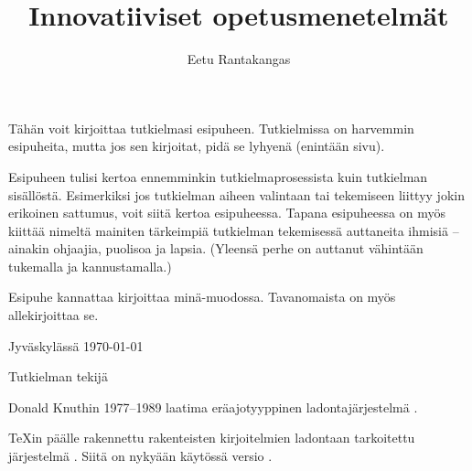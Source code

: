 \documentclass[utf8,bachelor]{gradu3}
\begin{document}
\title{Innovatiiviset opetusmenetelmät}

\author{Eetu Rantakangas}
\supervisor{-}

\maketitle

\preface
Tähän voit kirjoittaa tutkielmasi esipuheen.  Tutkielmissa on
harvemmin esipuheita, mutta jos sen kirjoitat, pidä se lyhyenä
(enintään sivu).

Esipuheen tulisi kertoa ennemminkin tutkielmaprosessista kuin
tutkielman sisällöstä.  Esimerkiksi jos tutkielman aiheen valintaan
tai tekemiseen liittyy jokin erikoinen sattumus, voit siitä kertoa
esipuheessa.  Tapana esipuheessa on myös kiittää nimeltä mainiten
tärkeimpiä tutkielman tekemisessä auttaneita ihmisiä -- ainakin
ohjaajia, puolisoa ja lapsia.  (Yleensä perhe on auttanut vähintään
tukemalla ja kannustamalla.)

Esipuhe kannattaa kirjoittaa minä-muodossa. Tavanomaista on myös
allekirjoittaa se.

Jyväskylässä \today

\bigskip

Tutkielman tekijä

\begin{thetermlist}
\item[\TeX] Donald Knuthin 1977--1989 laatima eräajotyyppinen
  ladontajärjestelmä \parencite[ks.][]{knuth86:_texbook}. 
\item[\LaTeX] \TeX in \parencite[ks.][]{knuth86:_texbook} päälle
  rakennettu rakenteisten kirjoitelmien ladontaan tarkoitettu
  järjestelmä \parencite[ks.][]{lamport94:_latex}.  Siitä on nykyään
  käytössä versio \LaTeXe.
\end{thetermlist}
\end{document}
